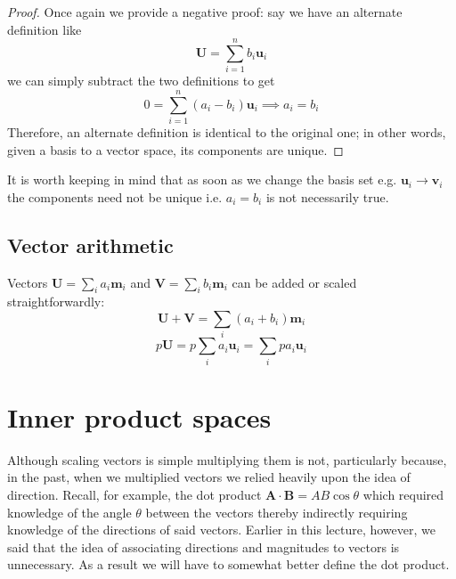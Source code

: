 \documentclass[english,seminar,headertitle]{lecture}
\begin{document}
\begin{proof}
	Once again we provide a negative proof: say we have an alternate definition like
	\[
		\mathbf{U} = \sum_{i=1}^n b_i \mathbf{u}_i
	\]
	we can simply subtract the two definitions to get
	\[
		0 = \sum_{i=1}^n (a_i-b_i) \mathbf{u}_i \implies a_i = b_i
	\]
	Therefore, an alternate definition is identical to the original one; in other words, given a basis to a vector space, its components are unique.
\end{proof}

It is worth keeping in mind that as soon as we change the basis set e.g. $\mathbf{u}_i \rightarrow \mathbf{v}_i$ the components need not be unique i.e. $a_i = b_i$ is not necessarily true.

\subsection{Vector arithmetic}

Vectors $\mathbf{U} = \sum_i a_i \mathbf{m}_i$ and $\mathbf{V} = \sum_i b_i \mathbf{m}_i$ can be added or scaled straightforwardly:
\begin{equation}
	\mathbf{U} + \mathbf{V} = \sum_i (a_i + b_i) \mathbf{m}_i \label{eq:vector-addition}
\end{equation}
\begin{equation}
	p \mathbf{U} = p \sum_i a_i \mathbf{u}_i = \sum_i pa_i \mathbf{u}_i \label{eq:vector-scalar-multiplication}
\end{equation}

\section{Inner product spaces}

Although scaling vectors is simple multiplying them is not, particularly because, in the past, when we multiplied vectors we relied heavily upon the idea of direction. Recall, for example, the dot product $\mathbf{A \cdot B} = AB \cos \theta$ which required knowledge of the angle $\theta$ between the vectors thereby indirectly requiring knowledge of the directions of said vectors. Earlier in this lecture, however, we said that the idea of associating directions and magnitudes to vectors is unnecessary. As a result we will have to somewhat better define the dot product.
\end{document}
